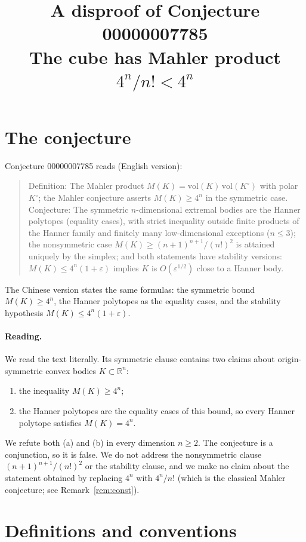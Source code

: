 \documentclass[11pt]{article}
\title{A disproof of Conjecture 00000007785\\[2pt]
\large The cube has Mahler product $4^n/n! < 4^n$}
\date{}
\theoremstyle{definition}
\theoremstyle{remark}
\renewcommand{\_}{\oldus\allowbreak}
\begin{document}
\sloppy
\maketitle

\section{The conjecture}

Conjecture 00000007785 reads (English version):

\begin{quote}
Definition: The Mahler product $M(K) = \mathrm{vol}(K)\,\mathrm{vol}(K^\circ)$ with polar $K^\circ$;
the Mahler conjecture asserts $M(K) \ge 4^n$ in the symmetric case. Conjecture: The symmetric
$n$-dimensional extremal bodies are the Hanner polytopes (equality cases), with strict inequality
outside finite products of the Hanner family and finitely many low-dimensional exceptions
($n\le 3$); the nonsymmetric case $M(K) \ge (n+1)^{n+1}/(n!)^2$ is attained uniquely by the
simplex; and both statements have stability versions: $M(K) \le 4^n(1+\varepsilon)$ implies $K$ is
$O(\varepsilon^{1/2})$ close to a Hanner body.
\end{quote}

The Chinese version states the same formulas: the symmetric bound $M(K)\ge 4^n$, the Hanner
polytopes as the equality cases, and the stability hypothesis $M(K)\le 4^n(1+\varepsilon)$.

\paragraph{Reading.} We read the text literally. Its symmetric clause contains two claims about
origin-symmetric convex bodies $K\subset\mathbb{R}^n$:
\begin{enumerate}[label=(\alph*)]
\item the inequality $M(K)\ge 4^n$;
\item the Hanner polytopes are the equality cases of this bound, so every Hanner polytope satisfies
$M(K)=4^n$.
\end{enumerate}
We refute both (a) and (b) in every dimension $n\ge 2$. The conjecture is a conjunction, so it is
false. We do not address the nonsymmetric clause $(n+1)^{n+1}/(n!)^2$ or the stability clause,
and we make no claim about the statement obtained by replacing $4^n$ with $4^n/n!$ (which is the
classical Mahler conjecture; see Remark~\ref{rem:const}).

\section{Definitions and conventions}
\end{document}
